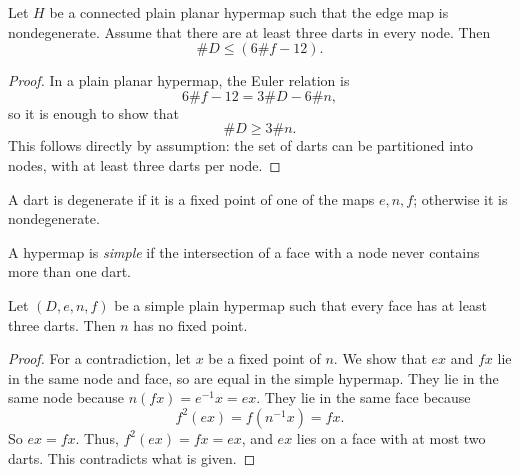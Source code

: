 \begin{lemma}\label{lemma:dart-upper} 
Let $H$ be a connected plain planar hypermap such that the edge map is nondegenerate.   Assume that
there are at least three darts in every node.  Then
$$
\# D \le (6 \#f - 12).
$$
\end{lemma}

\begin{proof}  In a plain planar hypermap, the Euler relation is
$$6 \#f - 12 = 3\#D - 6\#n,$$
so it is enough to show that
$$
\# D \ge 3\#n.
$$
This follows directly by assumption: the set of darts can be partitioned into nodes, with at least three darts per node.
\end{proof}


\begin{definition}[degenerate] A dart is degenerate if it is a
fixed point of one of the maps $e,n,f$; otherwise it is nondegenerate.  
\end{definition}

\begin{definition}[simple] 
A hypermap is {\it simple} if the intersection of a face with
a node never contains more than one dart.
\end{definition}


\begin{lemma} 
Let $(D,e,n,f)$ be a simple plain hypermap such that every face has
at least three darts.
Then $n$ has no fixed point.
\end{lemma}

\begin{proof}  For a contradiction, let $x$ be a fixed point of
$n$. We show that $e x$ and $f x$ lie in the same node and
face, so are equal in the simple hypermap.  
They lie in the same node because
$n(f x) = e^{-1} x = e x$. They lie in the same face because
    $$f^2 (e x) =  f(n^{-1} x) = f x.$$
So $e x = f x$.   Thus, $f^2 (e x) = f x = e x$, and $e x$ lies on a
face with at most two darts.  This contradicts what is given.
\end{proof}


